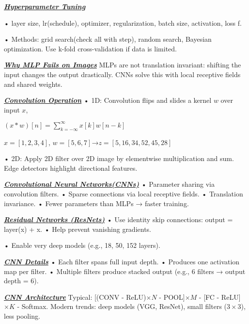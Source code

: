 \documentclass[10pt]{article}
\newcommand{\bulletPoint}[1]{\ul{\textit{\textbf{#1}}}}
\begin{document}
\begin{multicols*}{3}
\bulletPoint{Hyperparameter Tuning} \quad

• layer size, lr(schedule), optimizer, regularization, batch size, activation, loss f. \quad

• Methods: grid search(check all with step), random search, Bayesian optimization. Use k-fold cross-validation if data is limited.

\bulletPoint{Why MLP Fails on Images} \quad
MLPs are not translation invariant: shifting the input changes the output drastically. CNNs solve this with local receptive fields and shared weights.

\bulletPoint{Convolution Operation} \quad
• 1D: Convolution flips and slides a kernel $w$ over input $x$,

$(x * w)[n] = \sum_{k=-\infty}^{\infty} x[k] w[n-k]$

$x = [1, 2, 3, 4]$, $w = [5, 6, 7]$→$z = [5, 16, 34, 52, 45, 28]$

• 2D: Apply 2D filter over 2D image by elementwise multiplication and sum. Edge detectors highlight directional features.

\bulletPoint{Convolutional Neural Networks(CNNs)} \quad
• Parameter sharing via convolution filters. \quad
• Sparse connections via local receptive fields. \quad
• Translation invariance. \quad
• Fewer parameters than MLPs → faster training.






\bulletPoint{Residual Networks (ResNets)} \quad
• Use identity skip connections: output = layer(x) + x. \quad
• Help prevent vanishing gradients. \quad

• Enable very deep models (e.g., 18, 50, 152 layers).

\bulletPoint{CNN Details} \quad
• Each filter spans full input depth. \quad
• Produces one activation map per filter. \quad
• Multiple filters produce stacked output (e.g., 6 filters → output depth = 6). 

\bulletPoint{CNN Architecture} \quad
Typical: [(CONV - ReLU)$\times N$ - POOL]$\times M$ - [FC - ReLU]$\times K$ - Softmax. \quad
Modern trends: deep models (VGG, ResNet), small filters ($3\times3$), less pooling.



\end{multicols*}
\end{document}
